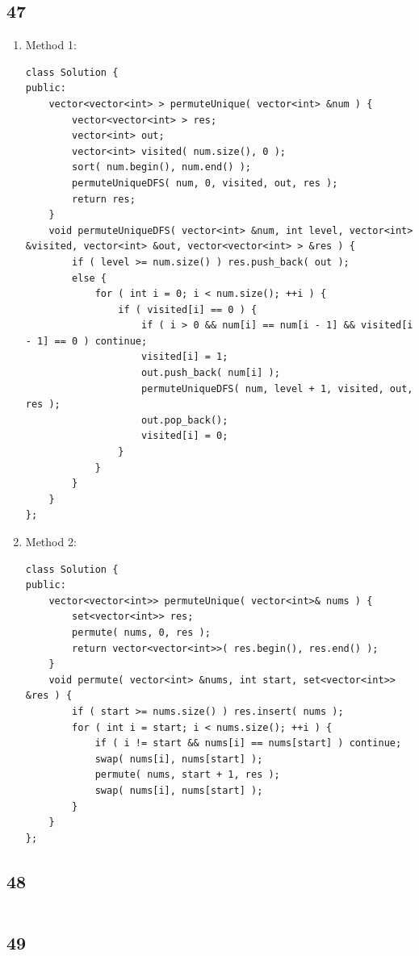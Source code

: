 \documentclass[12pt,a4paper]{article}
\begin{document}
\subsection{47}
\begin{enumerate}
\item
Method 1:
\begin{lstlisting}
class Solution {
public:
	vector<vector<int> > permuteUnique( vector<int> &num ) {
		vector<vector<int> > res;
		vector<int> out;
		vector<int> visited( num.size(), 0 );
		sort( num.begin(), num.end() );
		permuteUniqueDFS( num, 0, visited, out, res );
		return res;
	}
	void permuteUniqueDFS( vector<int> &num, int level, vector<int> &visited, vector<int> &out, vector<vector<int> > &res ) {
		if ( level >= num.size() ) res.push_back( out );
		else {
			for ( int i = 0; i < num.size(); ++i ) {
				if ( visited[i] == 0 ) {
					if ( i > 0 && num[i] == num[i - 1] && visited[i - 1] == 0 ) continue;
					visited[i] = 1;
					out.push_back( num[i] );
					permuteUniqueDFS( num, level + 1, visited, out, res );
					out.pop_back();
					visited[i] = 0;
				}
			}
		}
	}
};
\end{lstlisting}
\item
Method 2:
\begin{lstlisting}
class Solution {
public:
	vector<vector<int>> permuteUnique( vector<int>& nums ) {
		set<vector<int>> res;
		permute( nums, 0, res );
		return vector<vector<int>>( res.begin(), res.end() );
	}
	void permute( vector<int> &nums, int start, set<vector<int>> &res ) {
		if ( start >= nums.size() ) res.insert( nums );
		for ( int i = start; i < nums.size(); ++i ) {
			if ( i != start && nums[i] == nums[start] ) continue;
			swap( nums[i], nums[start] );
			permute( nums, start + 1, res );
			swap( nums[i], nums[start] );
		}
	}
};
\end{lstlisting}
\end{enumerate}

\subsection{48}
\begin{lstlisting}
\end{lstlisting}

\subsection{49}
\begin{lstlisting}
\end{lstlisting}
\end{document}

